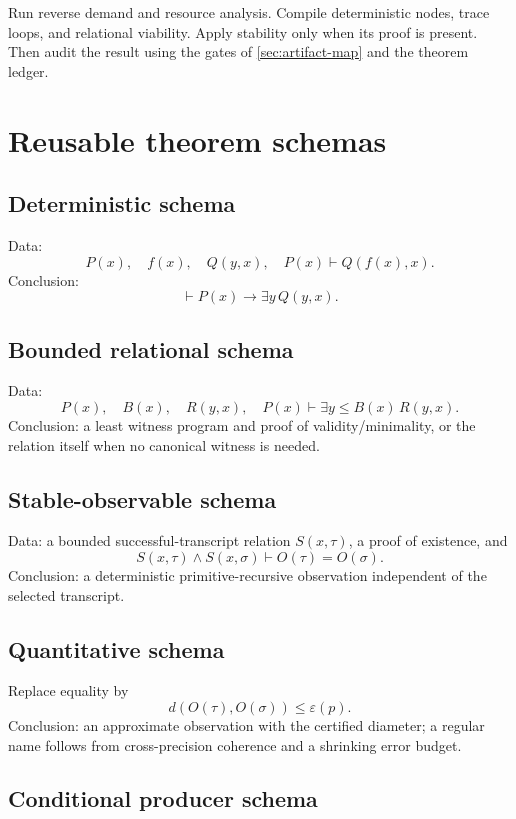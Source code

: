 Run reverse demand and resource analysis.  Compile deterministic nodes, trace loops, and relational viability.  Apply stability only when its proof is present.  Then audit the result using the gates of \cref{sec:artifact-map} and the theorem ledger.

\section{Reusable theorem schemas}

\subsection{Deterministic schema}

Data:
\[
 P(x),\quad f(x),\quad Q(y,x),\quad
 P(x)\vdash Q(f(x),x).
\]
Conclusion:
\[
 \vdash P(x)\to\exists y\,Q(y,x).
\]

\subsection{Bounded relational schema}

Data:
\[
 P(x),\quad B(x),\quad R(y,x),\quad
 P(x)\vdash\exists y\leq B(x)\,R(y,x).
\]
Conclusion: a least witness program and proof of validity/minimality, or the relation itself when no canonical witness is needed.

\subsection{Stable-observable schema}

Data: a bounded successful-transcript relation $S(x,\tau)$, a proof of existence, and
\[
 S(x,\tau)\wedge S(x,\sigma)\vdash O(\tau)=O(\sigma).
\]
Conclusion: a deterministic primitive-recursive observation independent of the selected transcript.

\subsection{Quantitative schema}

Replace equality by
\[
 d(O(\tau),O(\sigma))\leq\varepsilon(p).
\]
Conclusion: an approximate observation with the certified diameter; a regular name follows from cross-precision coherence and a shrinking error budget.

\subsection{Conditional producer schema}


